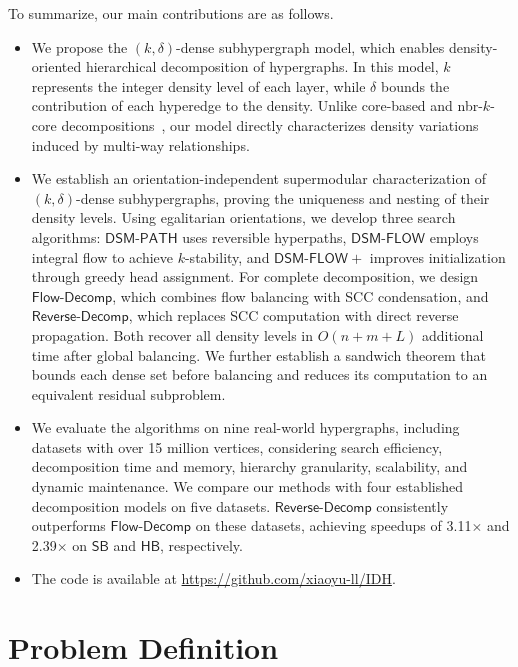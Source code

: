 \documentclass[twocolumn]{svjour3}
\newcommand{\kw}[1]{{\ensuremath{\mathsf{#1}}}\xspace}
\begin{document}
To summarize, our main contributions are as follows.
\begin{itemize}[leftmargin=10pt, topsep=0pt]
\item We propose the $(k,\delta)$-dense subhypergraph model, which enables density-oriented hierarchical decomposition of hypergraphs. In this model, $k$ represents the integer density level of each layer, while $\delta$ bounds the contribution of each hyperedge to the density. Unlike core-based and nbr-$k$-core decompositions~\cite{DBLP:journals/pvldb/ArafatKRG23,DBLP:journals/pacmmod/ZhangYWLZL25}, our model directly characterizes density variations induced by multi-way relationships.

\item We establish an orientation-independent supermodular characterization of $(k,\delta)$-dense subhypergraphs, proving the uniqueness and nesting of their density levels. Using egalitarian orientations, we develop three search algorithms: \kw{DSM\text{-}PATH} uses reversible hyperpaths, \kw{DSM\text{-}FLOW} employs integral flow to achieve $k$-stability, and \kw{DSM\text{-}FLOW+} improves initialization through greedy head assignment. For complete decomposition, we design \kw{Flow\text{-}Decomp}, which combines flow balancing with SCC condensation, and \kw{Reverse\text{-}Decomp}, which replaces SCC computation with direct reverse propagation. Both recover all density levels in $O(n+m+L)$ additional time after global balancing. We further establish a sandwich theorem that bounds each dense set before balancing and reduces its computation to an equivalent residual subproblem.

\item We evaluate the algorithms on nine real-world hypergraphs, including datasets with over 15 million vertices, considering search efficiency, decomposition time and memory, hierarchy granularity, scalability, and dynamic maintenance. We compare our methods with four established decomposition models on five datasets. \kw{Reverse\text{-}Decomp} consistently outperforms \kw{Flow\text{-}Decomp} on these datasets, achieving speedups of 3.11$\times$ and 2.39$\times$ on \kw{SB} and \kw{HB}, respectively.
\item The code is available at \url{https://github.com/xiaoyu-ll/IDH}.
\end{itemize}





\section{Problem Definition}
\end{document}
